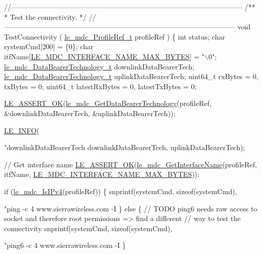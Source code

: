 \begin{DoxyCodeInclude}
\textcolor{comment}{//--------------------------------------------------------------------------------------------------}\textcolor{comment}{}
\textcolor{comment}{/**}
\textcolor{comment}{ * Test the connectivity.}
\textcolor{comment}{ */}
\textcolor{comment}{//--------------------------------------------------------------------------------------------------}
\textcolor{keywordtype}{void} TestConnectivity
(
    \hyperlink{le__mdc__interface_8h_a91074d8f0d88c6645e3085dfadf87011}{le\_mdc\_ProfileRef\_t} profileRef
)
\{
    \textcolor{keywordtype}{int} status;
    \textcolor{keywordtype}{char} systemCmd[200] = \{0\};
    \textcolor{keywordtype}{char} itfName[\hyperlink{le__mdc__interface_8h_a33ebf9afd03f0ffc91a80c32c15afb42}{LE\_MDC\_INTERFACE\_NAME\_MAX\_BYTES}] = \textcolor{stringliteral}{"\(\backslash\)0"};
    \hyperlink{le__mdc__interface_8h_a7a9d8c4b2053b048a53257ed810f527e}{le\_mdc\_DataBearerTechnology\_t} downlinkDataBearerTech;
    \hyperlink{le__mdc__interface_8h_a7a9d8c4b2053b048a53257ed810f527e}{le\_mdc\_DataBearerTechnology\_t} uplinkDataBearerTech;
    uint64\_t rxBytes = 0, txBytes = 0;
    uint64\_t latestRxBytes = 0, latestTxBytes = 0;

    \hyperlink{le__log_8h_a7cd2daa3d4af1de4d29e0eed95187484}{LE\_ASSERT\_OK}(\hyperlink{le__mdc__interface_8h_a1b17bb87b347162013b5ad608cdcda2d}{le\_mdc\_GetDataBearerTechnology}(profileRef,
                                                &downlinkDataBearerTech,
                                                &uplinkDataBearerTech));

    \hyperlink{le__log_8h_a23e6d206faa64f612045d688cdde5808}{LE\_INFO}(\textcolor{stringliteral}{"downlinkDataBearerTech %
            downlinkDataBearerTech, uplinkDataBearerTech);

    \textcolor{comment}{// Get interface name}
    \hyperlink{le__log_8h_a7cd2daa3d4af1de4d29e0eed95187484}{LE\_ASSERT\_OK}(\hyperlink{le__mdc__interface_8h_a4c22a8691d6e6a69270a7ed6ab9974af}{le\_mdc\_GetInterfaceName}(profileRef, itfName, 
      \hyperlink{le__mdc__interface_8h_a33ebf9afd03f0ffc91a80c32c15afb42}{LE\_MDC\_INTERFACE\_NAME\_MAX\_BYTES}));

    \textcolor{keywordflow}{if} (\hyperlink{le__mdc__interface_8h_aa3912e94864a6e5862e07f58b3772cba}{le\_mdc\_IsIPv4}(profileRef))
    \{
        snprintf(systemCmd, \textcolor{keyword}{sizeof}(systemCmd), \textcolor{stringliteral}{"ping -c 4 www.sierrawireless.com -I %
    \}
    \textcolor{keywordflow}{else}
    \{
        \textcolor{comment}{// TODO ping6 needs raw access to socket and therefore root permissions => find a different}
        \textcolor{comment}{// way to test the connectivity}
        snprintf(systemCmd, \textcolor{keyword}{sizeof}(systemCmd), \textcolor{stringliteral}{"ping6 -c 4 www.sierrawireless.com -I %
    \}

}}}
\end{DoxyCodeInclude}
